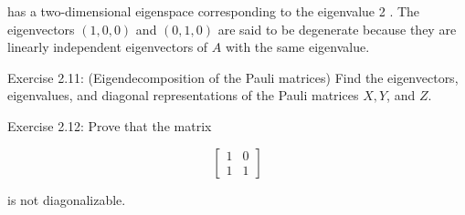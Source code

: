 has a two-dimensional eigenspace corresponding to the eigenvalue 2 . The eigenvectors $(1,0,0)$ and $(0,1,0)$ are said to be degenerate because they are linearly independent eigenvectors of $A$ with the same eigenvalue.

Exercise 2.11: (Eigendecomposition of the Pauli matrices) Find the eigenvectors, eigenvalues, and diagonal representations of the Pauli matrices $X, Y$, and $Z$.

Exercise 2.12: Prove that the matrix

$$
\left[\begin{array}{ll}
1 & 0 \\
1 & 1
\end{array}\right]
$$

is not diagonalizable.